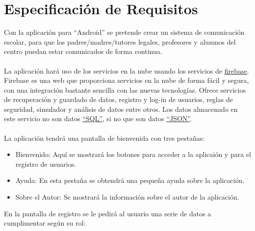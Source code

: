 %
%
%
%

\cleardoublepage
\chapter{Especificaci\'on de Requisitos}
\label{chap:requirements}

Con la aplicaci\'on \CollegeApp para ``Android'' se pretende crear un sistema de comunicaci\'on escolar, para que los padres/madres/tutores legales, profesores y alumnos del centro puedan estar comunicados de forma continua.\\
\\ 
La aplicaci\'on har\'a uso de los servicios en la nube usando los servicios de \href{https://www.firebase.com/}{firebase}.
Firebase es una web que proporciona servicios en la nube de forma f\'acil y segura, con una integraci\'on bastante sencilla con las nuevas tecnolog\'ias. Ofrece servicios de recuperaci\'on y guardado de datos, registro y log-in de usuarios, reglas de seguridad, simulador y an\'alisis de datos entre otros. Los datos almacenado en este servicio no son datos \href{http://es.wikipedia.org/wiki/SQL}{``SQL''}, si no que son datos \href{http://es.wikipedia.org/wiki/JSON}{``JSON''}.\\
\\
La aplicaci\'on tendr\'a una pantalla de bienvenida con tres pesta\~nas:
\begin{itemize}
	\item Bienvenido: Aqu\'i se mostrar\'a los botones para acceder a la aplicai\'on y para el registro de usuarios.
	\item Ayuda: En esta pesta\~na se obtendr\'a una peque\~na ayuda sobre la aplicaci\'on.
	\item Sobre el Autor: Se mostrar\'a la informaci\'on sobre el autor de la aplicaci\'on.
\end{itemize}
En la pantalla de registro se le pedir\'a al usuario una serie de datos a cumplimentar seg\'un su rol: 
